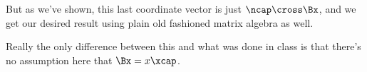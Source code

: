 But as we've shown, this last coordinate vector is just $\ncap \cross \Bx$, and we get our desired result using plain old fashioned matrix algebra as well.

Really the only difference between this and what was done in class is that there's no assumption here that $\Bx = x \xcap$.

\EndNoBibArticle
